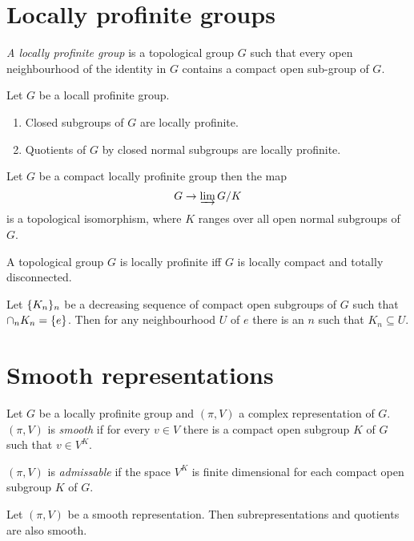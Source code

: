 \documentclass{memoir}
\begin{document}
\section{Locally profinite groups}
\begin{definition}
    \textit{A locally profinite group} is a topological group $G$ such that every open neighbourhood of the identity in $G$ contains a compact open sub-group of $G$.
\end{definition}
\begin{proposition}
    Let $G$ be a locall profinite group.
    \begin{enumerate}
        \item Closed subgroups of $G$ are locally profinite.
        \item Quotients of $G$ by closed normal subgroups are locally profinite.
    \end{enumerate}
\end{proposition}
\begin{proposition}
    Let $G$ be a compact locally profinite group then the map 
    \begin{equation}
        G\to \varinjlim G/K
    \end{equation}
    is a topological isomorphism, where $K$ ranges over all open normal subgroups of $G$.
\end{proposition}
\begin{proposition}
    A topological group $G$ is locally profinite iff $G$ is locally compact and totally disconnected.
\end{proposition}
\begin{proposition}
    Let $\lbrace K_n\rbrace_n$ be a decreasing sequence of compact open subgroups of $G$ such that $\cap_nK_n = \lbrace e\rbrace$.
    Then for any neighbourhood $U$ of $e$ there is an $n$ such that $K_n\subseteq U$.
\end{proposition}
\section{Smooth representations}
\begin{definition}
    Let $G$ be a locally profinite group and $(\pi,V)$ a complex representation of $G$.
    $(\pi,V)$ is \textit{smooth} if for every $v\in V$ there is a compact open subgroup $K$ of $G$ such that $v\in V^K$.
    
    $(\pi,V)$ is \textit{admissable} if the space $V^K$ is finite dimensional for each compact open subgroup $K$ of $G$.
\end{definition}
\begin{proposition}
    Let $(\pi,V)$ be a smooth representation.
    Then subrepresentations and quotients are also smooth.
\end{proposition}
\end{document}
